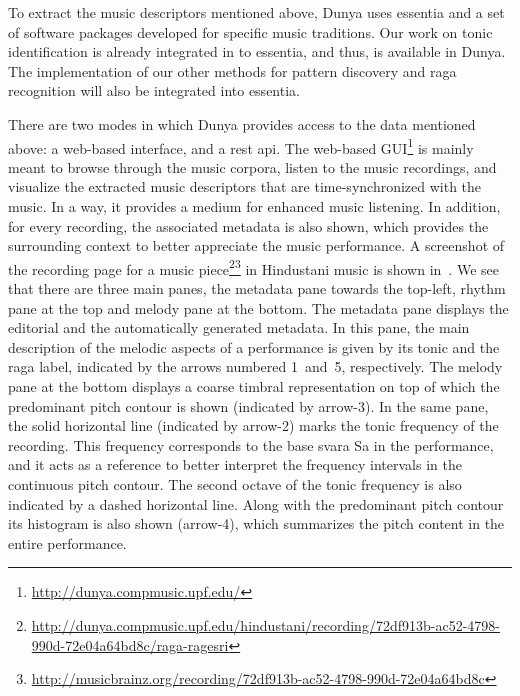 To extract the music descriptors mentioned above, Dunya uses \gls{essentia} and a set of software packages developed for specific music traditions. Our work on tonic identification is already integrated in to \gls{essentia}, and thus, is available in Dunya. The implementation of our other methods for pattern discovery and \gls{raga} recognition will also be integrated into \gls{essentia}. 

There are two modes in which Dunya provides access to the data mentioned above: a web-based interface, and a \acrshort{rest} \acrshort{api}. The web-based GUI\footnote{\url{http://dunya.compmusic.upf.edu/}} is mainly meant to browse through the music corpora, listen to the music recordings, and visualize the extracted music descriptors that are time-synchronized with the music. In a way, it provides a medium for enhanced music listening. In addition, for every recording, the associated metadata is also shown, which provides the surrounding context to better appreciate the music performance. A screenshot of the recording page for a music piece\footnote{\url{http://dunya.compmusic.upf.edu/hindustani/recording/72df913b-ac52-4798-990d-72e04a64bd8c/raga-ragesri}}\footnote{\url{http://musicbrainz.org/recording/72df913b-ac52-4798-990d-72e04a64bd8c}} in Hindustani music is shown in~. We see that there are three main panes, the metadata pane towards the top-left, rhythm pane at the top and melody pane at the bottom. The metadata pane displays the editorial and the automatically generated metadata. In this pane, the main description of the melodic aspects of a performance is given by its tonic and the \gls{raga} label, indicated by the arrows numbered 1~and~5, respectively. The melody pane at the bottom displays a coarse timbral representation on top of which the predominant pitch contour is shown (indicated by arrow-3). In the same pane, the solid horizontal line (indicated by arrow-2) marks the tonic frequency of the recording. This frequency corresponds to the base \gls{svara} Sa in the performance, and it acts as a reference to better interpret the frequency intervals in the continuous pitch contour. The second octave of the tonic frequency is also indicated by a dashed horizontal line. Along with the predominant pitch contour its histogram is also shown (arrow-4), which summarizes the pitch content in the entire performance. 

